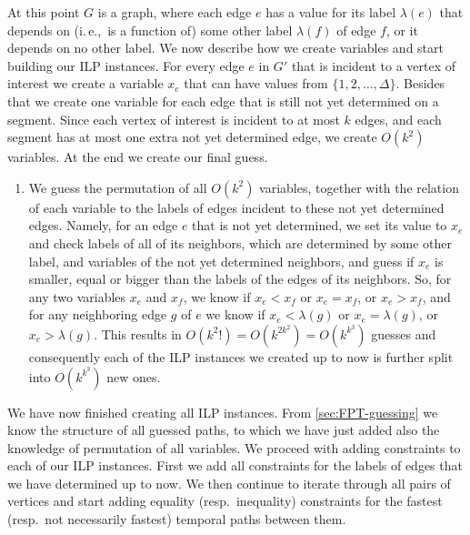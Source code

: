 \documentclass[a4paper,UKenglish,cleveref, autoref, thm-restate]{lipics-v2021}
\newcommand{\ie}{i.\,e.,\ }
\newcounter{guesscounter}
\begin{document}
At this point $G$ is a graph, where each edge $e$ has a value for its label $\lambda(e)$
that depends on (\ie is a function of) some other label $\lambda(f)$ of edge $f$,
or it depends on no other label.
We now describe how we create variables and start building our ILP instances. 
For every edge $e$ in $G'$ that is incident to a vertex of interest we create a variable $x_e$ that can have values from $ \{1, 2, \dots, \Delta\}$.
Besides that we create one variable for each edge that is still not yet determined on a segment.
Since each vertex of interest is incident to at most $k$ edges, and each segment has at most one extra not yet determined edge, we create $O(k^2)$ variables.
At the end we create our final guess.
\begin{enumerate}[G-1.]
\setcounter{enumi}{\value{guesscounter}}
    \item \label{FPT:guessallPermutations}
We guess the permutation of all $O(k^2)$ variables,
together with the relation of each variable to the labels of edges incident to these not yet determined edges.
Namely, for an edge $e$ that is not yet determined, we set its value to $x_e$ and check labels of all of its neighbors,
which are determined by some other label,
and variables of the not yet determined neighbors,
and guess if $x_e$ is smaller, equal or bigger than the labels of the edges of its neighbors.
So, for any two variables $x_e$ and $x_f$, we know if $x_e < x_f$ or $x_e = x_f$, or $x_e > x_f$,
and for any neighboring edge $g$ of $e$ we know if $x_e < \lambda(g)$ or 
$x_e = \lambda(g)$, or $x_e > \lambda(g)$.
This results in $O(k^2 !) = O(k^{2k^2}) = O(k^{k^3})$ guesses
and consequently
each of the ILP instances we created up to now is further split into $O(k^{k^3})$ new ones.
\end{enumerate}
We have now finished creating all ILP instances.
From \cref{sec:FPT-guessing} we know the structure of all guessed paths, to which we have just added also the knowledge of permutation of all variables.
We proceed with adding constraints to each of our ILP instances.
First we add all constraints for the labels of edges that we have determined up to now.
We then continue to iterate through all pairs of vertices and start adding equality (resp.~inequality) constraints for the fastest (resp.~not necessarily fastest) temporal paths between them.
\end{document}
